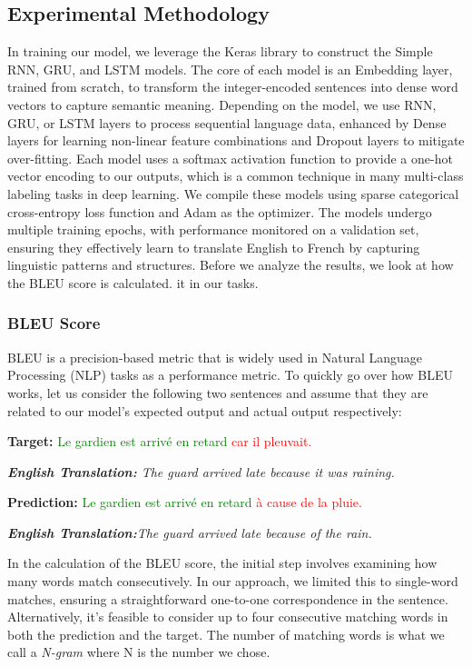 \documentclass{article}
\begin{document}
\subsection{Experimental Methodology}
In training our model, we leverage the Keras library to construct the Simple RNN, GRU, and LSTM models. The core of each model is an Embedding layer, trained from scratch, to transform the integer-encoded sentences into dense word vectors to capture semantic meaning. Depending on the model, we use RNN, GRU, or LSTM layers to process sequential language data, enhanced by Dense layers for learning non-linear feature combinations and Dropout layers to mitigate over-fitting. Each model uses a softmax activation function to provide a one-hot vector encoding to our outputs, which is a common technique in many multi-class labeling tasks in deep learning.  We compile these models using sparse categorical cross-entropy loss function and Adam as the optimizer. The models undergo multiple training epochs, with performance monitored on a validation set, ensuring they effectively learn to translate English to French by capturing linguistic patterns and structures. Before we analyze the results, we look at how the BLEU score is calculated.  
it in our tasks. 

\subsubsection{BLEU Score}

BLEU is a precision-based metric that is widely used 
in Natural Language Processing (NLP) tasks as a performance metric. To quickly go over how BLEU works, let us consider the following two sentences and 
assume that they are related to our model's expected output and
actual output respectively: 



\textbf{Target:} \textcolor{green}{Le gardien est arrivé en retard} \textcolor{red}{car il pleuvait.} 


\textit{\textbf{English Translation:} The guard arrived late because it was raining.}


\textbf{Prediction:} \textcolor{green}{Le gardien est arrivé en retard} \textcolor{red}{à cause de la pluie.} 


\textit{\textbf{English Translation:}The guard arrived late because of the rain.}


In the calculation of the BLEU score, the initial step involves examining how many words match consecutively. In our approach, we limited this to single-word matches, ensuring a straightforward one-to-one correspondence in the 
sentence. Alternatively, it's feasible to consider up to four consecutive matching words in both the prediction and the target. The number of matching 
words is what we call a \textit{N-gram} where N is the number we chose. 
\end{document}
